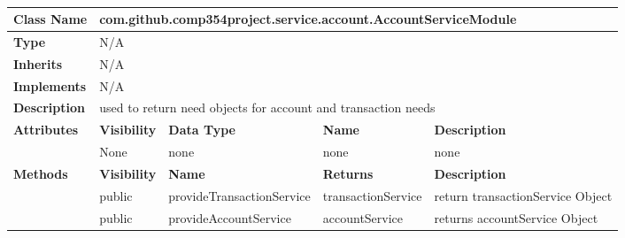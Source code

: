 \documentclass[12pt]{article}
\begin{document}
\begin{table}[H]
\centering
\caption{}
\label{my-label}
\begin{tabular}{|l|l|l|l|l|}
\hline
\textbf{Class Name}                  & \multicolumn{4}{l|}{com.github.comp354project.service.account.AccountServiceModule}                     \\ \hline
\textbf{Type}                        & \multicolumn{4}{l|}{N/A}                                                                                \\ \hline
\textbf{Inherits}                    & \multicolumn{4}{l|}{N/A}                                                                                \\ \hline
\textbf{Implements}                  & \multicolumn{4}{l|}{N/A}                                                                                \\ \hline
\textbf{Description}                 & \multicolumn{4}{l|}{used to return need objects for account and transaction needs}                      \\ \hline
\multirow{2}{*}{\textbf{Attributes}} & \textbf{Visibility} & \textbf{Data Type}        & \textbf{Name}      & \textbf{Description}             \\ \cline{2-5} 
                                     & None                & none                      & none               & none                             \\ \hline
\multirow{3}{*}{\textbf{Methods}}    & \textbf{Visibility} & \textbf{Name}             & \textbf{Returns}   & \textbf{Description}             \\ \cline{2-5} 
                                     & public              & provideTransactionService & transactionService & return transactionService Object \\ \cline{2-5} 
                                     & public              & provideAccountService     & accountService     & returns accountService Object    \\ \hline
\end{tabular}
\end{table}
\end{document}
